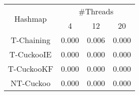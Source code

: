 \begin{tabular}{|c|c|c|c|}
\hline
\multirow{2}{*}{Hashmap} & \multicolumn{3}{c|}{\#Threads}\\\cline{2-4}& 4 & 12 & 20\\
\hline
\hline
T-Chaining & 0.000 & 0.006 & 0.000\\
T-CuckooIE & 0.000 & 0.000 & 0.000\\
T-CuckooKF & 0.000 & 0.000 & 0.000\\
NT-Cuckoo & 0.000 & 0.000 & 0.000\\
\hline
\end{tabular}
